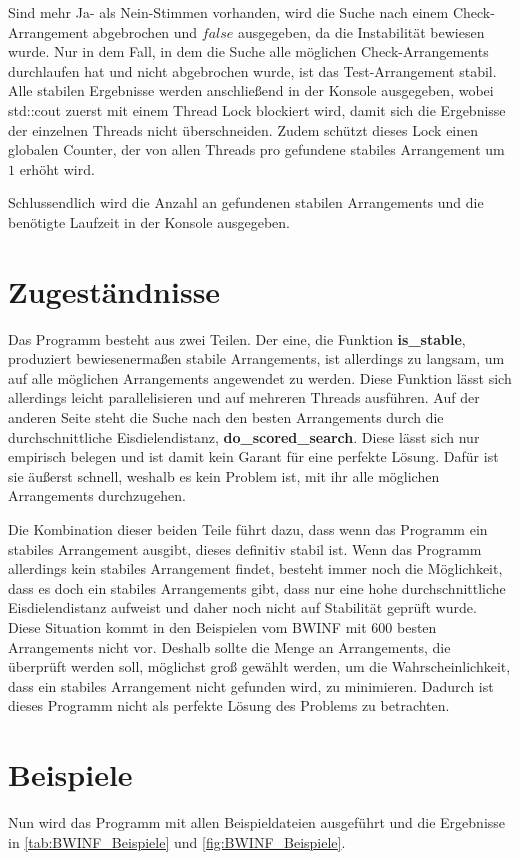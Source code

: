 \documentclass[a4paper,10pt,ngerman,captions=figureheading]{scrartcl}
\begin{document}
\medskip
Sind mehr Ja- als Nein-Stimmen vorhanden, wird die Suche nach einem Check-Arrangement abgebrochen und $false$ ausgegeben, da die Instabilität bewiesen wurde.
Nur in dem Fall, in dem die Suche alle möglichen Check-Arrangements durchlaufen hat und nicht abgebrochen wurde, ist das Test-Arrangement stabil.
Alle stabilen Ergebnisse werden anschließend in der Konsole ausgegeben, wobei std::cout zuerst mit einem Thread Lock blockiert wird, damit sich die Ergebnisse der einzelnen Threads nicht überschneiden.
Zudem schützt dieses Lock einen globalen Counter, der von allen Threads pro gefundene stabiles Arrangement um $1$ erhöht wird.

\medskip
Schlussendlich wird die Anzahl an gefundenen stabilen Arrangements und die benötigte Laufzeit in der Konsole ausgegeben.

\section{Zugeständnisse}
Das Programm besteht aus zwei Teilen.
Der eine, die Funktion \textbf{is\_stable}, produziert bewiesenermaßen stabile Arrangements, ist allerdings zu langsam, um auf alle möglichen Arrangements angewendet zu werden.
Diese Funktion lässt sich allerdings leicht parallelisieren und auf mehreren Threads ausführen.
Auf der anderen Seite steht die Suche nach den besten Arrangements durch die durchschnittliche Eisdielendistanz, \textbf{do\_scored\_search}.
Diese lässt sich nur empirisch belegen und ist damit kein Garant für eine perfekte Lösung.
Dafür ist sie äußerst schnell, weshalb es kein Problem ist, mit ihr alle möglichen Arrangements durchzugehen.

Die Kombination dieser beiden Teile führt dazu, dass wenn das Programm ein stabiles Arrangement ausgibt, dieses definitiv stabil ist.
Wenn das Programm allerdings kein stabiles Arrangement findet, besteht immer noch die Möglichkeit, dass es doch ein stabiles Arrangements gibt, dass nur eine hohe durchschnittliche Eisdielendistanz aufweist und daher noch nicht auf Stabilität geprüft wurde.
Diese Situation kommt in den Beispielen vom BWINF mit $600$ besten Arrangements nicht vor.
Deshalb sollte die Menge an Arrangements, die überprüft werden soll, möglichst groß gewählt werden, um die Wahrscheinlichkeit, dass ein stabiles Arrangement nicht gefunden wird, zu minimieren.
Dadurch ist dieses Programm nicht als perfekte Lösung des Problems zu betrachten.

\section{Beispiele}
Nun wird das Programm mit allen Beispieldateien ausgeführt und die Ergebnisse in \autoref{tab:BWINF_Beispiele} und \autoref{fig:BWINF_Beispiele}.
\end{document}
